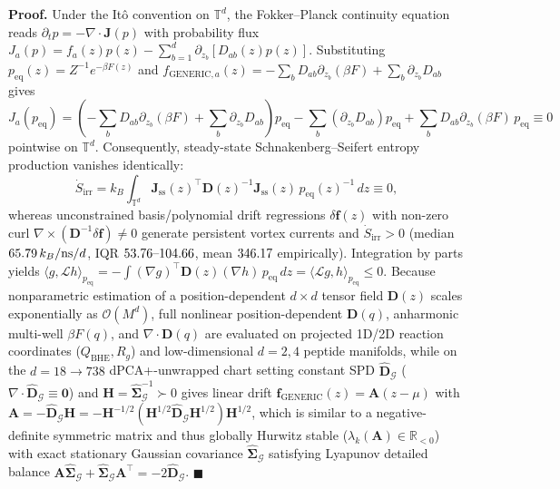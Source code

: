 \documentclass[10pt,letterpaper]{article}
\begin{document}
\textbf{Proof.} Under the It\^o convention on $\mathbb{T}^d$, the Fokker--Planck continuity equation reads $\partial_t p = -\nabla\!\cdot\!\bm{J}(p)$ with probability flux $J_a(p) = f_a(z)p(z) - \sum_{b=1}^d \partial_{z_b}[D_{ab}(z)p(z)]$. Substituting $p_{\mathrm{eq}}(z) = Z^{-1}e^{-\beta F(z)}$ and $f_{\mathrm{GENERIC},a}(z) = -\sum_b D_{ab}\partial_{z_b}(\beta F) + \sum_b \partial_{z_b} D_{ab}$ gives
\[
J_a(p_{\mathrm{eq}}) = \left(-\sum_b D_{ab}\partial_{z_b}(\beta F) + \sum_b \partial_{z_b} D_{ab}\right)p_{\mathrm{eq}} - \sum_b (\partial_{z_b} D_{ab})p_{\mathrm{eq}} + \sum_b D_{ab}\partial_{z_b}(\beta F)\,p_{\mathrm{eq}} \equiv 0
\]
pointwise on $\mathbb{T}^d$. Consequently, steady-state Schnakenberg--Seifert entropy production vanishes identically:
\[
\dot{S}_{\mathrm{irr}} = k_B \int_{\mathbb{T}^d} \bm{J}_{\mathrm{ss}}(z)^\top \mathbf{D}(z)^{-1} \bm{J}_{\mathrm{ss}}(z)\,p_{\mathrm{eq}}(z)^{-1}\,dz \equiv 0,
\]
whereas unconstrained basis/polynomial drift regressions $\delta\mathbf{f}(z)$ with non-zero curl $\nabla \times (\mathbf{D}^{-1}\delta\mathbf{f}) \ne 0$ generate persistent vortex currents and $\dot{S}_{\mathrm{irr}} > 0$ (median $65.79{}\,k_B/\text{ns}/d$, IQR $53.76{}\text{--}104.66{}$, mean $346.17{}$ empirically). Integration by parts yields $\langle g, \mathcal{L}h\rangle_{p_{\mathrm{eq}}} = -\int (\nabla g)^\top \mathbf{D}(z)(\nabla h)\,p_{\mathrm{eq}}\,dz = \langle \mathcal{L}g, h\rangle_{p_{\mathrm{eq}}} \le 0$. Because nonparametric estimation of a position-dependent $d\times d$ tensor field $\mathbf{D}(z)$ scales exponentially as $\mathcal{O}(M^d)$, full nonlinear position-dependent $\mathbf{D}(q)$, anharmonic multi-well $\beta F(q)$, and $\nabla\!\cdot\!\mathbf{D}(q)$ are evaluated on projected 1D/2D reaction coordinates ($Q_{\mathrm{BHE}}, R_g$) and low-dimensional $d=2,4$ peptide manifolds, while on the $d = 18 \to 738$ dPCA+-unwrapped chart setting constant SPD $\hat{\mathbf{D}}_{\mathcal{G}}$ ($\nabla\!\cdot\!\hat{\mathbf{D}}_{\mathcal{G}} \equiv \mathbf{0}$) and $\mathbf{H} = \hat{\bm{\Sigma}}_{\mathcal{G}}^{-1} \succ 0$ gives linear drift $\mathbf{f}_{\mathrm{GENERIC}}(z) = \mathbf{A}(z-\mu)$ with $\mathbf{A} = -\hat{\mathbf{D}}_{\mathcal{G}}\mathbf{H} = -\mathbf{H}^{-1/2}(\mathbf{H}^{1/2}\hat{\mathbf{D}}_{\mathcal{G}}\mathbf{H}^{1/2})\mathbf{H}^{1/2}$, which is similar to a negative-definite symmetric matrix and thus globally Hurwitz stable ($\lambda_k(\mathbf{A}) \in \mathbb{R}_{<0}$) with exact stationary Gaussian covariance $\hat{\bm{\Sigma}}_{\mathcal{G}}$ satisfying Lyapunov detailed balance $\mathbf{A}\hat{\bm{\Sigma}}_{\mathcal{G}} + \hat{\bm{\Sigma}}_{\mathcal{G}}\mathbf{A}^\top = -2\hat{\mathbf{D}}_{\mathcal{G}}$. $\blacksquare$
\end{document}
